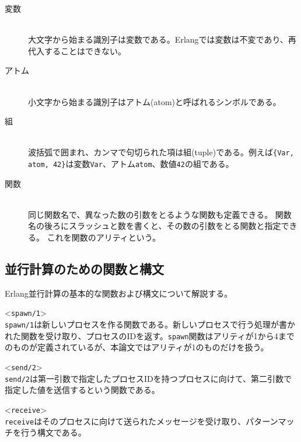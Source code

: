 \begin{description}
\item[変数]\mbox{}\\
  大文字から始まる識別子は変数である。Erlangでは変数は不変であり、再代入することはできない。
\item[アトム]\mbox{}\\
  小文字から始まる識別子はアトム(atom)と呼ばれるシンボルである。
\item[組]\mbox{}\\
  波括弧で囲まれ、カンマで句切られた項は組(tuple)である。例えば\lstinline|{Var, atom, 42}|は変数\lstinline{Var}、アトム\lstinline{atom}、数値\lstinline{42}の組である。
\item[関数]\mbox{}\\
  同じ関数名で、異なった数の引数をとるような関数も定義できる。
  関数名の後ろにスラッシュと数を書くと、その数の引数をとる関数と指定できる。
  これを関数のアリティという。
\end{description}

\subsection{並行計算のための関数と構文}

Erlang並行計算の基本的な関数および構文について解説する。

\begin{description}
\item<\lstinline{spawn/1}>\mbox{}\\
  \lstinline{spawn/1}は新しいプロセスを作る関数である。新しいプロセスで行う処理が書かれた関数を受け取り、プロセスのIDを返す。\lstinline{spawn}関数はアリティが1から4までのものが定義されているが、本論文ではアリティが1のものだけを扱う。
\item<\lstinline{send/2}>\mbox{}\\
  \lstinline{send/2}は第一引数で指定したプロセスIDを持つプロセスに向けて、第二引数で指定した値を送信するという関数である。
\item<\lstinline{receive}>\mbox{}\\
  \lstinline{receive}はそのプロセスに向けて送られたメッセージを受け取り、パターンマッチを行う構文である。
\end{description}
